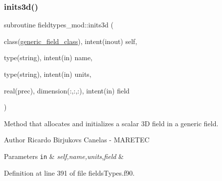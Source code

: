 \subsubsection{\texorpdfstring{inits3d()}{inits3d()}}
{\footnotesize\ttfamily subroutine fieldtypes\+\_\+mod\+::inits3d (\begin{DoxyParamCaption}\item[{class(\mbox{\hyperlink{structfieldtypes__mod_1_1generic__field__class}{generic\+\_\+field\+\_\+class}}), intent(inout)}]{self,  }\item[{type(string), intent(in)}]{name,  }\item[{type(string), intent(in)}]{units,  }\item[{real(prec), dimension(\+:,\+:,\+:), intent(in)}]{field }\end{DoxyParamCaption})\hspace{0.3cm}{\ttfamily [private]}}



Method that allocates and initializes a scalar 3D field in a generic field. 

\begin{DoxyAuthor}{Author}
Ricardo Birjukovs Canelas -\/ M\+A\+R\+E\+T\+EC 
\end{DoxyAuthor}

\begin{DoxyParams}[1]{Parameters}
\mbox{\tt in}  & {\em self,name,units,field} & \\
\hline
\end{DoxyParams}


Definition at line 391 of file fields\+Types.\+f90.


